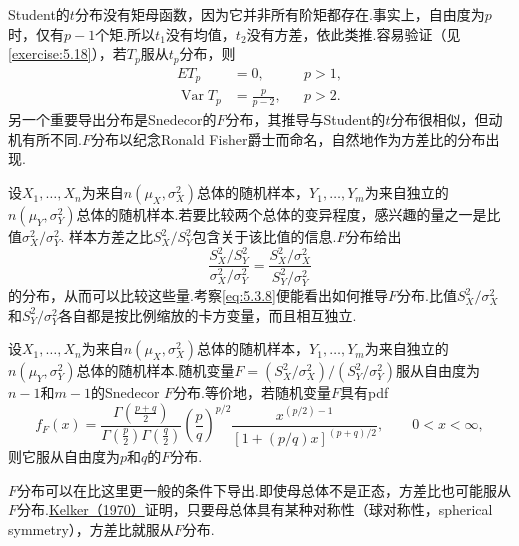 Student的$t$分布没有矩母函数，因为它并非所有阶矩都存在.事实上，自由度为$p$时，仅有$p-1$个矩.所以$t_1$没有均值，$t_2$没有方差，依此类推.容易验证（见\autoref{exercise:5.18}），若$T_p$服从$t_p$分布，则
\begin{equation}\label{eq:5.3.7}
\begin{aligned}ET_p&=0,&&p>1,\\ \operatorname{Var}T_p&=\frac p{p-2},&&p>2.\end{aligned}
\end{equation}
另一个重要导出分布是Snedecor的$F$分布，其推导与Student的$t$分布很相似，但动机有所不同.$F$分布以纪念Ronald Fisher爵士而命名，自然地作为方差比的分布出现.
\begin{example}[方差比的分布]\label{ex:5.3.5}
设$X_1,\ldots,X_n$为来自$n(\mu_X,\sigma_X^2)$总体的随机样本，$Y_1,\ldots,Y_m$为来自独立的$n(\mu_Y,\sigma_Y^2)$总体的随机样本.若要比较两个总体的变异程度，感兴趣的量之一是比值$\sigma_X^2/\sigma_Y^2$.
样本方差之比$S_X^2/S_Y^2$包含关于该比值的信息.$F$分布给出
\begin{equation}\label{eq:5.3.8}
\frac{S_X^2/S_Y^2}{\sigma_X^2/\sigma_Y^2}=\frac{S_X^2/\sigma_X^2}{S_Y^2/\sigma_Y^2}
\end{equation}
的分布，从而可以比较这些量.考察\eqref{eq:5.3.8}便能看出如何推导$F$分布.比值$S_X^2/\sigma_X^2$和$S_Y^2/\sigma_Y^2$各自都是按比例缩放的卡方变量，而且相互独立.
\end{example}
\begin{definition}\label{def:5.3.6}
设$X_1,\ldots,X_n$为来自$n(\mu_X,\sigma_X^2)$总体的随机样本，$Y_1,\ldots,Y_m$为来自独立的$n(\mu_Y,\sigma_Y^2)$总体的随机样本.随机变量$F=(S_X^2/\sigma_X^2)/(S_Y^2/\sigma_Y^2)$服从自由度为$n-1$和$m-1$的Snedecor $F$分布.等价地，若随机变量$F$具有pdf
\begin{equation}\label{eq:5.3.9}
f_F(x)=\frac{\Gamma\left(\frac{p+q}2\right)}{\Gamma\left(\frac p2\right)\Gamma\left(\frac q2\right)}\left(\frac pq\right)^{p/2}\frac{x^{(p/2)-1}}{[1+(p/q)x]^{(p+q)/2}},\qquad 0<x<\infty,
\end{equation}
则它服从自由度为$p$和$q$的$F$分布.
\end{definition}
$F$分布可以在比这里更一般的条件下导出.即使母总体不是正态，方差比也可能服从$F$分布.\hyperref[bib:source188]{Kelker（1970）}证明，只要母总体具有某种对称性（球对称性，spherical symmetry），方差比就服从$F$分布.

